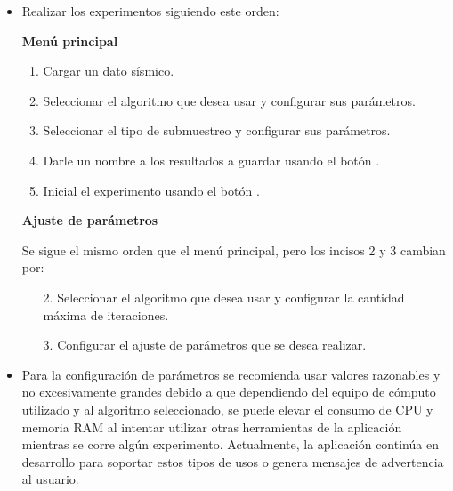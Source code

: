 \documentclass[12pt,twoside,letter]{ol-softwaremanual}
\begin{document}
\begin{itemize}[leftmargin=0.5in]
	\setlength\itemsep{0em} 
    \item Realizar los experimentos siguiendo este orden:
    
    \textbf{Menú principal}
    
    \begin{enumerate}[leftmargin=0.5in]
    	\setlength\itemsep{0em} 
        \item Cargar un dato sísmico.
        \item Seleccionar el algoritmo que desea usar y configurar sus parámetros.
        \item Seleccionar el tipo de submuestreo y configurar sus parámetros.
        \item Darle un nombre a los resultados a guardar usando el botón \hspace{0.5mm} \faSave.
        \item Inicial el experimento usando el botón \hspace{0.5mm} \faPlay.
    \end{enumerate}
    
    \textbf{Ajuste de parámetros}
    
    Se sigue el mismo orden que el menú principal, pero los incisos 2 y 3 cambian por:
    
    \begin{enumerate}[leftmargin=0.5in]
    	\setlength\itemsep{0em} 
        \item[2.] Seleccionar el algoritmo que desea usar y configurar la cantidad máxima de iteraciones.
        \item[3.] Configurar el ajuste de parámetros que se desea realizar.
    \end{enumerate}
    
    \item Para la configuración de parámetros se recomienda usar valores razonables y no excesivamente grandes debido a que dependiendo del equipo de cómputo utilizado y al algoritmo seleccionado, se puede elevar el consumo de CPU y memoria RAM al intentar utilizar otras herramientas de la aplicación mientras se corre algún experimento. Actualmente, la aplicación continúa en desarrollo para soportar estos tipos de usos o genera mensajes de advertencia al usuario.
    
\end{itemize}


\end{document}
